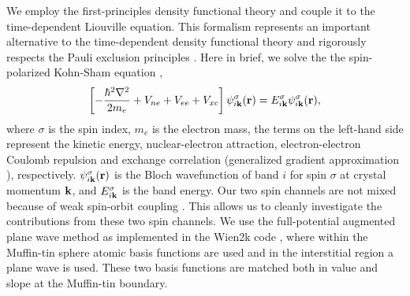 \documentclass[checkin,showpacs,psfig,aps,pra]{revtex4}
\newcommand{\be}{\begin{equation}}
\newcommand{\ee}{\end{equation}}
\begin{document}
We employ the first-principles density functional theory and couple it
to the time-dependent Liouville equation. This formalism represents an
important alternative to the time-dependent density functional theory
and rigorously respects the Pauli exclusion principles \cite{jpcm16}.
Here in brief, we solve the the spin-polarized Kohn-Sham equation
\cite{wien2k,blaha2020,np09,prb09}, \be \left
     [-\frac{\hbar^2\nabla^2}{2m_e}+V_{ne}+V_{ee}+V_{xc} \right
     ]\psi_{\ik}^\sigma(\rr)=E_{\ik}^\sigma \psi_{\ik}^\sigma
     (\rr), \label{ks} \ee where $\sigma$ is the spin index, $m_e$ is
     the electron mass, the terms on the left-hand side represent the
     kinetic energy, nuclear-electron attraction, electron-electron
     Coulomb repulsion and exchange correlation (generalized gradient
     approximation \cite{pbe}), respectively.
     $\psi_{i{\bf k}}^\sigma({\bf r})$ is the Bloch wavefunction of band $i$
     for spin $\sigma$ at crystal momentum ${\bf k}$, and
     $E_{i{\bf k}}^\sigma$ is the band energy. {Our two spin channels
       are not mixed because of weak spin-orbit coupling
       \cite{soulen1998}. This allows us to cleanly investigate the
       contributions from these two spin channels}.  We use the
     full-potential augmented plane wave method as implemented in the
     Wien2k code \cite{wien2k}, where within the Muffin-tin sphere
     atomic basis functions are used and in the interstitial region a
     plane wave is used. These two basis functions are matched both in
     value and slope at the Muffin-tin boundary.
\end{document}
